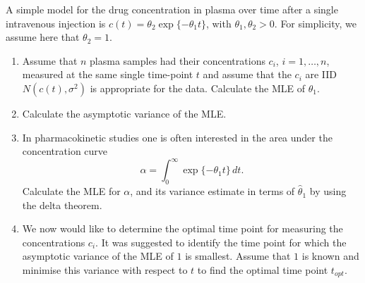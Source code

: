 \documentclass[10pt, a4paper]{article}
\begin{document}
\begin{problem}
    A simple model for the drug concentration in plasma over time after a single intravenous injection is $c(t) = \theta_2\exp\{-\theta_1t\}$,
    with $\theta_1, \theta_2 > 0$.
    For simplicity,
    we assume here that $\theta_2 = 1$.
    
    \begin{enumerate}[label = (\alph*)]
        \item Assume that $n$ plasma samples had their concentrations $c_i$,
        $i = 1, \dotsc, n$,
        measured at the same single time-point $t$ and assume that the $c_i$ are IID $N(c(t), \sigma ^ 2)$ is appropriate for the data.
        Calculate the MLE of $\theta_1$.

        \item Calculate the asymptotic variance of the MLE.

        \item In pharmacokinetic studies one is often interested in the area under the concentration curve
        \[
        \alpha = \int_{0}^{\infty}\exp\{-\theta_1t\}\,dt.
        \]
        Calculate the MLE for $\alpha$,
        and its variance estimate in terms of $\hat{\theta}_1$ by using the delta theorem.

       \item We now would like to determine the optimal time point for measuring the concentrations $c_i$.
       It was suggested to identify the time point for which the asymptotic variance of the MLE of $1$ is smallest.
       Assume that $1$ is known and minimise this variance with respect to $t$ to find the optimal time point $t_{opt}$.
    \end{enumerate}


\end{problem}
\end{document}
